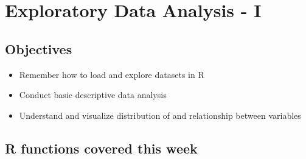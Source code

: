 \documentclass[
]{book}
\providecommand{\tightlist}{%
  \setlength{\itemsep}{0pt}\setlength{\parskip}{0pt}}
\begin{document}
\hypertarget{eda-1}{%
\chapter{Exploratory Data Analysis - I}\label{eda-1}}

\hypertarget{objectives-1}{%
\section{Objectives}\label{objectives-1}}

\begin{itemize}
\tightlist
\item
  Remember how to load and explore datasets in R
\item
  Conduct basic descriptive data analysis
\item
  Understand and visualize distribution of and relationship between variables
\end{itemize}

\hypertarget{r-functions-covered-this-week}{%
\section{R functions covered this week}\label{r-functions-covered-this-week}}
\end{document}
